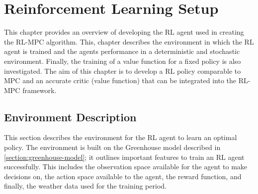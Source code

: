 \chapter{Reinforcement Learning Setup}
\label{chapter:RL}
This chapter provides an overview of developing the RL agent used in creating the RL-MPC algorithm. This, chapter describes the environment in which the RL agent is trained and the agents performance in a deterministic and stochastic environment. Finally, the training of a value function for a fixed policy is also investigated. The aim of this chapter is to develop a RL policy comparable to MPC and an accurate critic (value function) that can be integrated into the RL-MPC framework.

\section{Environment Description} \label{section:env-description}
This section describes the environment for the RL agent to learn an optimal policy. The environment is built on the Greenhouse model described in \autoref{section:greenhouse-model}; it outlines important features to train an RL agent successfully. This includes the observation space available for the agent to make decisions on, the action space available to the agent, the reward function, and finally, the weather data used for the training period.

